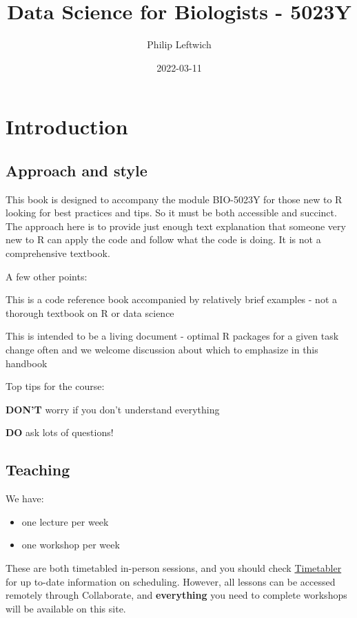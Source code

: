 \documentclass[
]{book}
\title{Data Science for Biologists - 5023Y}
\author{Philip Leftwich}
\date{2022-03-11}
\providecommand{\tightlist}{%
  \setlength{\itemsep}{0pt}\setlength{\parskip}{0pt}}
\begin{document}
\maketitle

{
\setcounter{tocdepth}{1}
\tableofcontents
}
\hypertarget{introduction}{%
\chapter{Introduction}\label{introduction}}

\hypertarget{approach-and-style}{%
\section{Approach and style}\label{approach-and-style}}

This book is designed to accompany the module BIO-5023Y for those new to R looking for best practices and tips. So it must be both accessible and succinct. The approach here is to provide just enough text explanation that someone very new to R can apply the code and follow what the code is doing. It is not a comprehensive textbook.

A few other points:

This is a code reference book accompanied by relatively brief examples - not a thorough textbook on R or data science

This is intended to be a living document - optimal R packages for a given task change often and we welcome discussion about which to emphasize in this handbook

Top tips for the course:

\textbf{DON'T} worry if you don't understand everything

\textbf{DO} ask lots of questions!

\hypertarget{teaching}{%
\section{Teaching}\label{teaching}}

We have:

\begin{itemize}
\tightlist
\item
  one lecture per week
\item
  one workshop per week
\end{itemize}

These are both timetabled in-person sessions, and you should check \href{https://timetabler.uea.ac.uk/Timetable}{Timetabler} for up to-date information on scheduling. However, all lessons can be accessed remotely through Collaborate, and \textbf{everything} you need to complete workshops will be available on this site.
\end{document}
